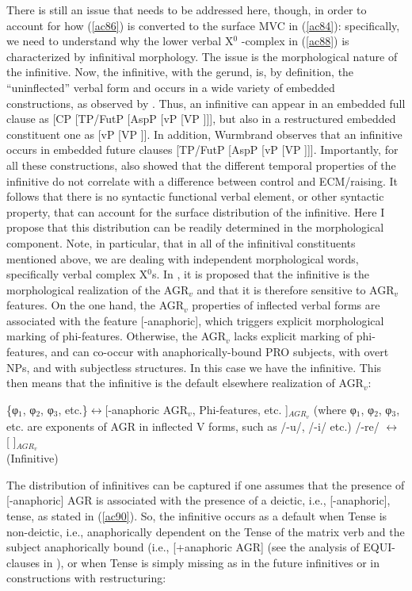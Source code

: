 \documentclass[output=paper]{langscibook}
\begin{document}
There is still an issue that needs to be addressed here, though, in order to account for how (\ref{ac86}) is converted to the surface MVC in (\ref{ac84}): specifically, we need to understand why the lower verbal X$^0$ -complex in (\ref{ac88}) is characterized by infinitival morphology. The issue is the morphological nature of the infinitive. Now, the infinitive, with the gerund, is, by definition, the “uninflected” verbal form and occurs in a wide variety of embedded constructions, as observed by \cite{wurmbrand2014a}.  Thus, an infinitive can appear in an embedded full clause as [CP [TP/FutP [AspP [vP [VP ]]], but also in a restructured embedded constituent one as [vP [VP ]].  In addition, Wurmbrand observes that an infinitive occurs in embedded future clauses  [TP/FutP [AspP [vP [VP ]]]. Importantly, for all these constructions, \cite{wurmbrand2014a} also showed that the different temporal properties of the infinitive do not correlate with a difference between control and ECM/raising. It follows that there is no syntactic functional verbal element, or other syntactic property, that can account for the surface distribution of the infinitive. Here I propose that this distribution can be readily determined in the morphological component. Note, in particular, that in all of the infinitival constituents mentioned above, we are dealing with independent morphological words, specifically verbal complex X$^0$s. In \cite{calabrese1993a}, it is proposed that the infinitive is the morphological realization of the  AGR$_v$ and that it is therefore sensitive to  AGR$_v$ features. On the one hand, the  AGR$_v$ properties of inflected verbal forms are associated with the feature [-anaphoric], which triggers explicit morphological marking of phi-features.  Otherwise, the  AGR$_v$ lacks explicit marking of phi-features, and can co-occur with anaphorically-bound PRO subjects, with overt NPs, and with subjectless structures. In this case we have the infinitive. This then means that the infinitive is the default elsewhere realization of AGR$_v$:

\ea\label{ac89}
    \ea \label{ac89a}\{φ$_1$, φ$_2$, φ$_3$, etc.\}$\longleftrightarrow$[-anaphoric  AGR$_v$, Phi-features, etc. ]$_{AGR_v}$
       (where φ$_1$, φ$_2$, φ$_3$, etc. are exponents of AGR in inflected V forms, such as /-u/, /-i/ etc.)
    \ex \label{ac89b}/-re/ $\longleftrightarrow$  [   ]$_{AGR_v}$\\
     (Infinitive)
    \z
\z

The distribution of infinitives can be captured if one assumes that the presence of [-anaphoric] AGR is associated with the presence of a deictic, i.e., [-anaphoric], tense, as stated in (\ref{ac90}). So, the infinitive occurs as a default when Tense is non-deictic, i.e., anaphorically dependent on the Tense of the matrix verb and the subject anaphorically bound (i.e., [+anaphoric AGR] (see the analysis of EQUI-clauses in \cite{calabrese1993a}), or when Tense is simply missing as in the future infinitives or in constructions with restructuring:
\end{document}
